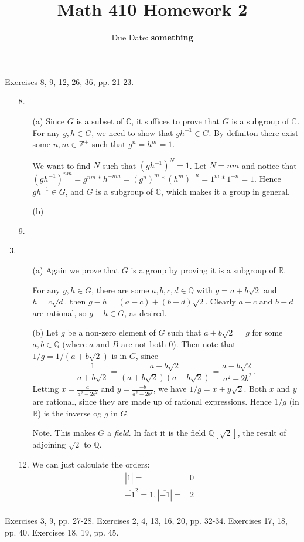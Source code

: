 \documentclass{article}
\title{\textbf{Math 410 Homework 2}}
\author{Due Date: \textbf{something}}
\date{}
\begin{document}
\maketitle

Exercises 8, 9, 12, 26, 36, pp. 21-23.

\begin{enumerate}
    \item [8.] 
    \begin{enumerate}
        \item [(a)] Since $G$ is a subset of $\mathbb C$, it suffices to prove that $G$ is a subgroup of $\mathbb C$. For any $g, h \in G$, we need to show that $gh^{-1} \in G$. By definiton there exist some $n, m \in \mathbb Z^+$ such that $g^n = h^m = 1$. 
        
        We want to find $N$ such that $(gh^{-1})^N = 1$. Let $N = nm$ and notice that $(gh^{-1})^{nm} = g^{nm} * h^{-nm} = (g^n)^m * (h^m)^{-n} = 1^m * 1 ^{-n} = 1$. Hence $gh^{-1} \in G$, and $G$ is a subgroup of $\mathbb C$, which makes it a group in general.
        \item [(b)] 
    \end{enumerate}

    \item [9.]
    \item \begin{enumerate}
        \item [(a)] Again we prove that $G$ is a group by proving it is a subgroup of $\mathbb R$. 
        
        For any $g, h \in G$, there are some $a, b, c, d \in \mathbb Q$ with $g = a + b \sqrt 2$ and $h = c \sqrt d$. then $g - h = (a - c) + (b - d)\sqrt 2$. Clearly $a - c$ and $b - d$ are rational, so $g - h \in G$, as desired. 

        \item [(b)] Let $g$ be a non-zero element of $G$ such that $a + b \sqrt 2 = g$ for some $a, b \in \mathbb Q$ (where $a$ and $B$ are not both $0$). Then note that $1 / g = 1 / (a + b \sqrt 2)$ is in $G$, since \[\frac 1 {a + b \sqrt 2} = \frac {a - b\sqrt 2} {(a + b \sqrt 2) (a - b \sqrt 2)} = \frac {a - b \sqrt 2} {a^2 - 2b^2}.\] Letting $x = \frac a {a^2 - 2b^2}$ and $y = \frac {-b} {a^2 - 2b^2}$, we have $1 / g = x + y \sqrt 2$. 
        Both $x$ and $y$ are rational, since they are made up of rational expressions. Hence $1 / g$ (in $\mathbb R$) is the inverse og $g$ in $G$. 

        \item[Note.] This makes $G$ a \textit{field}. In fact it is the field $\mathbb Q[\sqrt 2]$, the result of adjoining $\sqrt 2$ to $\mathbb Q$. 
    \end{enumerate}
    
    \item [12.] We can just calculate the orders:
    \begin{align*}    
        |\overline{1}| =& 0 \\
        \overline{-1}^2 = 1, |\overline {-1}| =& 2 \\
        
    \end{align*}
    
\end{enumerate}

Exercises 3, 9, pp. 27-28.
Exercises 2, 4, 13, 16, 20, pp. 32-34.
Exercises 17, 18, pp. 40.
Exercises 18, 19, pp. 45.
\end{document}
